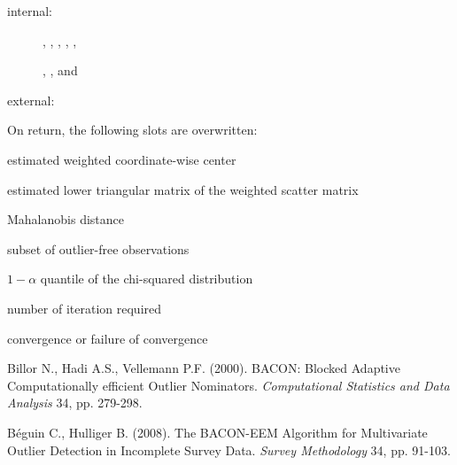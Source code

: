 \documentclass[a4paper,oneside,10pt,DIV=12]{scrartcl}
\begin{document}
\begin{Dependencies}
	\begin{description}
		\item[internal:]
		,
		,
		,
		,
		,

		,
		, and
		\item[external:]
	\end{description}
\end{Dependencies}
\begin{Value}
On return, the following slots are overwritten:
	\begin{ldescription}
		\item[\code{center}] estimated weighted coordinate-wise center
		\item[\code{scatter}] estimated lower triangular matrix of the
			weighted scatter matrix
		\item[\code{dist}] Mahalanobis distance
		\item[\code{subset0}] subset of outlier-free observations
		\item[\code{cutoff}] $1-\alpha$ quantile of the chi-squared
			distribution
		\item[\code{maxiter}] number of iteration required
		\item[\code{success}] convergence or failure of convergence
	\end{ldescription}
\end{Value}

\begin{References}
Billor N., Hadi A.S., Vellemann P.F. (2000). BACON: Blocked Adaptive
Computationally efficient Outlier Nominators. \textit{Computational Statistics
and Data Analysis} 34, pp. 279-298.

B{\'e}guin C., Hulliger B. (2008). The BACON-EEM Algorithm for Multivariate
Outlier Detection in Incomplete Survey Data. \textit{Survey Methodology} 34,
pp. 91-103.
\end{References}
\end{document}
